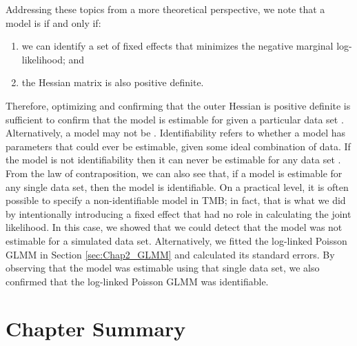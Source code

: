 Addressing these topics from a more theoretical perspective, we note that a model is  if and only if:
\begin{enumerate}
    \item we can identify a set of fixed effects that minimizes the negative marginal log-likelihood; and 

    \item the Hessian matrix is also positive definite.
\end{enumerate}
Therefore, optimizing and confirming that the outer Hessian is positive definite is sufficient to confirm that the model is estimable for given a particular data set \cite{hunter_rank_2009}.  Alternatively, a model may not be .  Identifiability refers to whether a model has parameters that could ever be estimable, given some ideal combination of data.  If the model is not identifiability then it can never be estimable for any data set \cite{jacquez_numerical_1985}.  From the law of contraposition, we can also see that, if a model is estimable for any single data set, then the model is identifiable.  On a practical level, it is often possible to specify a non-identifiable model in TMB;  in fact, that is what we did by intentionally introducing a fixed effect that had no role in calculating the joint likelihood.  In this case, we showed that we could detect that the model was not estimable for a simulated data set.  Alternatively, we fitted the log-linked Poisson GLMM in Section \ref{sec:Chap2_GLMM} and calculated its standard errors.  By observing that the model was estimable using that single data set, we also confirmed that the log-linked Poisson GLMM was identifiable. 

\section{Chapter Summary}

